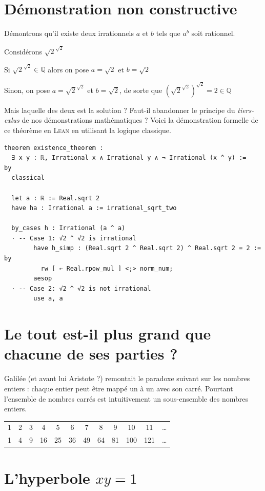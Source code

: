 \section{Démonstration non constructive}
Démontrons qu'il existe deux irrationnels $a$ et $b$ tels que $a^b$ soit rationnel.

Considérons $\sqrt{2}^{\sqrt{2}}$ 

Si  $\sqrt{2}^{\sqrt{2}} \in \mathbb{Q}$ alors on pose $a = \sqrt{2}$ et $b= \sqrt{2}$

Sinon, on pose $a = \sqrt{2}^{\sqrt{2}}$ et $b=\sqrt{2}$, 
de sorte que $ {(\sqrt{2}^{\sqrt{2}})}^{\sqrt{2}} = 2 \in \mathbb{Q} $


Mais laquelle des deux est la solution ?
Faut-il abandonner le principe du \textit{tiers-exlus} de nos démonstrations
mathématiques ?
Voici la démonstration formelle de ce théorème en \textsc{Lean} en utilisant la logique classique.


\begin{verbatim}
theorem existence_theorem :
  ∃ x y : ℝ, Irrational x ∧ Irrational y ∧ ¬ Irrational (x ^ y) :=
by
  classical

  let a : ℝ := Real.sqrt 2
  have ha : Irrational a := irrational_sqrt_two

  by_cases h : Irrational (a ^ a)
  · -- Case 1: √2 ^ √2 is irrational
        have h_simp : (Real.sqrt 2 ^ Real.sqrt 2) ^ Real.sqrt 2 = 2 := by
          rw [ ← Real.rpow_mul ] <;> norm_num;
        aesop
  · -- Case 2: √2 ^ √2 is not irrational
        use a, a
\end{verbatim}
\section{Le tout est-il plus grand que chacune de ses parties ?}
Galilée (et avant lui Aristote ?) remontait le paradoxe suivant sur les nombres entiers : chaque entier peut être mappé 
un à un avec son carré. Pourtant l'ensemble de nombres carrés est intuitivement un sous-ensemble
des nombres entiers.


\begin{tabular}{cccccccccccc}
1 &2 &3 &4  &5  &6  &7  &8  &9  &10  &11  & \ldots \\  
1 &4 &9 &16 &25 &36 &49 &64 &81 &100 &121 & \ldots 
\end{tabular}

\section{L'hyperbole $xy=1$}

